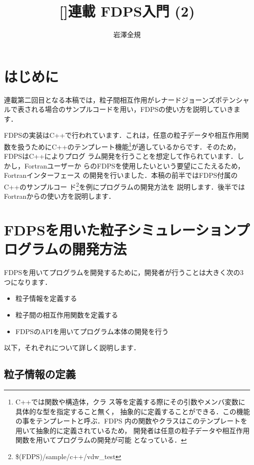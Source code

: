 \documentclass[twocolumn,10pt]{jarticle}
\title{%
[]連載 FDPS入門 (2) 
}
\author{%
岩澤全規
}
\affiliation{%
理化学研究所\quad 計算科学研究機構
}
\begin{document}
\maketitle

\section{はじめに}

連載第二回目となる本稿では，粒子間相互作用がレナードジョーンズポテンシャ
ルで表される場合のサンプルコードを用い，FDPSの使い方を説明していきます．

FDPSの実装はC++で行われています．これは，任意の粒子データや相互作用関
数を扱うためにC++のテンプレート機能\footnote{C++では関数や構造体，クラ
  ス等を定義する際にその引数やメンバ変数に具体的な型を指定すること無く，
  抽象的に定義することができる．この機能の事をテンプレートと呼ぶ．FDPS
  内の関数やクラスはこのテンプレートを用いて抽象的に定義されているため，
  開発者は任意の粒子データや相互作用関数を用いてプログラムの開発が可能
  となっている．}が適しているからです．そのため，FDPSはC++によりプログ
ラム開発を行うことを想定して作られています．しかし，Fortranユーザーか
らのFDPSを使用したいという要望にこたえるため，Fortranインターフェース
の開発を行いました．本稿の前半ではFDPS付属のC++のサンプルコー
ド\footnote{\$(FDPS)/sample/c++/vdw\_test}を例にプログラムの開発方法を
説明します．後半ではFortranからの使い方を説明します．

\section{FDPSを用いた粒子シミュレーションプログラムの開発方法}

FDPSを用いてプログラムを開発するために，開発者が行うことは大きく次の3
つになります．

\begin{itemize}
\item 粒子情報を定義する
\item 粒子間の相互作用関数を定義する
\item FDPSのAPIを用いてプログラム本体の開発を行う
\end{itemize}

以下，それぞれについて詳しく説明します．

\subsection{粒子情報の定義}
\end{document}
